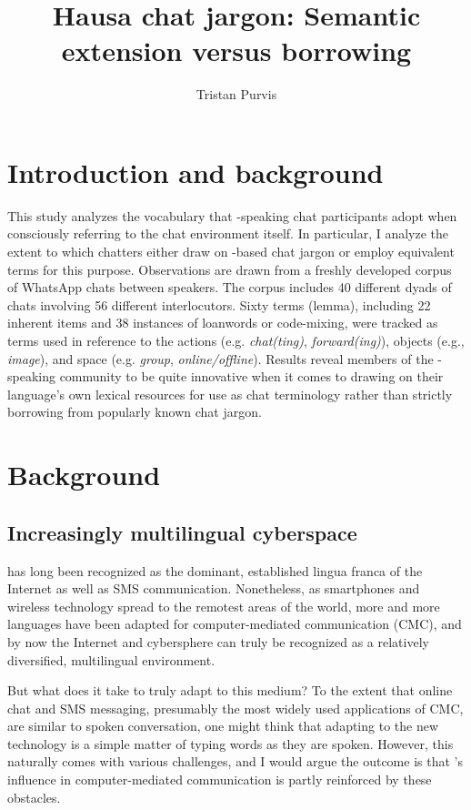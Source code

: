 \documentclass[output=paper,newtxmath,modfonts,nonflat,hidelinks]{langsci/langscibook}
\title{Hausa chat jargon: Semantic extension versus borrowing}
\author{Tristan Purvis\affiliation{American University of Nigeria}}
\begin{document}
\maketitle

\section{Introduction and background}

This study analyzes the vocabulary that -speaking chat participants adopt when consciously referring to the chat environment itself. In particular, I analyze the extent to which chatters either draw on -based chat jargon or employ equivalent  terms for this purpose. Observations are drawn from a freshly developed corpus of WhatsApp chats between  speakers. The corpus includes 40 different dyads of chats involving 56 different interlocutors. Sixty terms (lemma), including 22 inherent  items and 38 instances of  loanwords or code-mixing, were tracked as terms used in reference to the actions (e.g. \textit{chat(ting)}, \textit{forward(ing)}), objects (e.g., \textit{image}), and space (e.g. \textit{group}, \textit{online/offline}). Results reveal members of the -speaking community to be quite innovative when it comes to drawing on their language’s own lexical resources for use as chat terminology rather than strictly borrowing from popularly known  chat jargon.

\section{Background}
\subsection{Increasingly multilingual cyberspace}

 has long been recognized as the dominant, established lingua franca of the Internet \citep{danet2007} as well as SMS communication. Nonetheless, as smartphones and wireless technology spread to the remotest areas of the world, more and more languages have been adapted for computer-mediated communication (CMC), and by now the Internet and cybersphere can truly be recognized as a relatively diversified, multilingual environment. 

But what does it take to truly adapt to this medium? To the extent that online chat and SMS messaging, presumably the most widely used applications of CMC, are similar to spoken conversation, one might think that adapting to the new technology is a simple matter of typing words as they are spoken. However, this naturally comes with various challenges, and I would argue the outcome is that ’s influence in computer-mediated communication is partly reinforced by these obstacles. 
\end{document}
